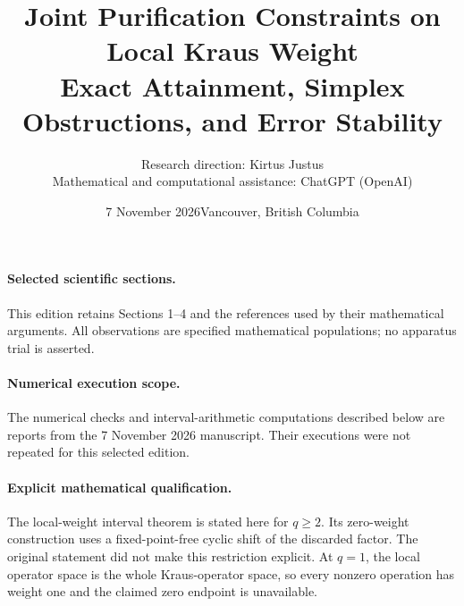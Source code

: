 \documentclass[10pt,letterpaper]{article}
\title{Joint Purification Constraints on Local Kraus Weight\\[3pt]\large Exact Attainment, Simplex Obstructions, and Error Stability}
\author{Research direction: Kirtus Justus\\Mathematical and computational assistance: ChatGPT (OpenAI)}
\date{7 November 2026\quad Vancouver, British Columbia}
\begin{document}
\maketitle
\vspace{-1.1em}
\paragraph{Selected scientific sections.} This edition retains Sections 1--4 and the references used by their mathematical arguments. All observations are specified mathematical populations; no apparatus trial is asserted.
\paragraph{Numerical execution scope.} The numerical checks and interval-arithmetic computations described below are reports from the 7 November 2026 manuscript. Their executions were not repeated for this selected edition.
\paragraph{Explicit mathematical qualification.} The local-weight interval theorem is stated here for $q\ge2$. Its zero-weight construction uses a fixed-point-free cyclic shift of the discarded factor. The original statement did not make this restriction explicit. At $q=1$, the local operator space is the whole Kraus-operator space, so every nonzero operation has weight one and the claimed zero endpoint is unavailable.
\end{document}
